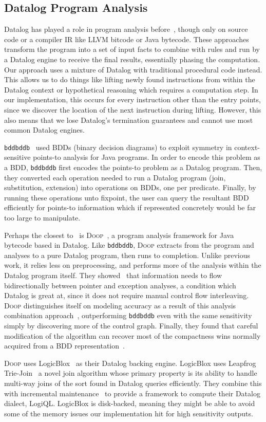 \subsection{Datalog Program Analysis}
Datalog has played a role in program analysis before~\cite{bddbddb,doop1}, though only on source code or a compiler IR like LLVM bitcode or Java bytecode.
These approaches transform the program into a set of input facts to combine with rules and run by a Datalog engine to receive the final results, essentially phasing the computation.
Our approach uses a mixture of Datalog with traditional procedural code instead.
This allows us to do things like lifting newly found instructions from within the Datalog context or hypothetical reasoning which requires a computation step.
In our implementation, this occurs for every instruction other than the entry points, since we discover the location of the next instruction during lifting.
However, this also means that we lose Datalog's termination guarantees and cannot use most common Datalog engines.

\texttt{bddbddb}~\cite{bddbddb} used BDDs (binary decision diagrams) to exploit symmetry in context-sensitive points-to analysis for Java programs.
In order to encode this problem as a BDD, \texttt{bddbddb} first encodes the points-to problem as a Datalog program.
Then, they converted each operation needed to run a Datalog program (join, substitution, extension) into operations on BDDs, one per predicate.
Finally, by running these operations unto fixpoint, the user can query the resultant BDD efficiently for points-to information which if represented concretely would be far too large to manipulate.

Perhaps the closest to \aliasname\ is \textsc{Doop}~\cite{doop1,doop2,doop3}, a program analysis framework for Java bytecode based in Datalog.
Like \texttt{bddbddb}, \textsc{Doop} extracts from the program and analyses to a pure Datalog program, then runs to completion.
Unlike previous work, it relies less on preprocessing, and performs more of the analysis within the Datalog program itself.
They showed~\cite{doop1} that information needs to flow bidirectionally between pointer and exception analyses, a condition which Datalog is great at, since it does not require manual control flow interleaving.
\textsc{Doop} distinguishes itself on modeling accuracy as a result of this analysis combination approach~\cite{doop2}, outperforming \texttt{bddbddb} even with the same sensitivity simply by discovering more of the control graph.
Finally, they found that careful modification of the algorithm can recover most of the compactness wins normally acquired from a BDD representation~\cite{doop3}.

\textsc{Doop} uses LogicBlox~\cite{logicblox} as their Datalog backing engine.
LogicBlox uses Leapfrog Trie-Join~\cite{lftj} a novel join algorithm whose primary property is its ability to handle multi-way joins of the sort found in Datalog queries efficiently.
They combine this with incremental maintenance~\cite{lftj-incr} to provide a framework to compute their Datalog dialect, LogiQL.
LogicBlox is disk-backed, meaning they might be able to avoid some of the memory issues our implementation hit for high sensitivity outputs.
